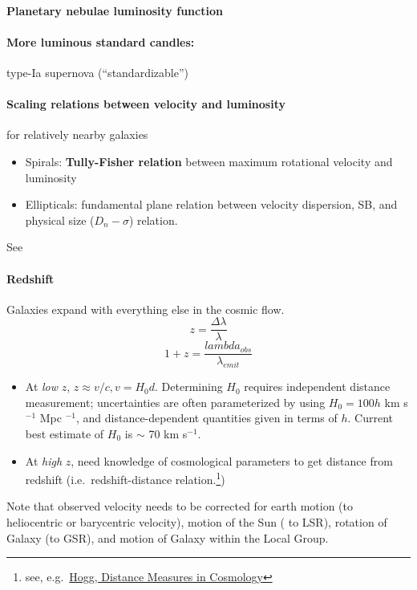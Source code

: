 \documentclass{article}
\newcommand{\mynotes}[1]{\textcolor{cadmiumgreen}{#1}}
\begin{document}
\paragraph{Planetary nebulae luminosity function}

\paragraph{More luminous standard candles:}
type-Ia supernova (``standardizable'')

\paragraph{Scaling relations between velocity and luminosity}
\mynotes{for relatively nearby galaxies}
\begin{itemize}
    \item Spirals: \textbf{Tully-Fisher relation} between maximum rotational velocity and luminosity
    \item Ellipticals: fundamental plane relation between velocity
        dispersion, SB, and physical size
        ($D_{n}-\sigma$) relation.
\end{itemize}
See %

\paragraph{Redshift}
Galaxies expand with everything else in the cosmic flow.
\[
    z = \frac{\Delta\lambda}{\lambda}
    \]
\[
    1 + z = \frac{lambda_{obs}}{\lambda_{emit}}
    \]
\begin{itemize}
    \item At \emph{low} $z$, $z \approx v/c, v = H_{0}d$.
        Determining $H_{0}$ requires independent distance measurement;
        uncertainties are often parameterized by using $H_{0} = 100h$
        km s$^{-1}$ Mpc $^{-1}$, and distance-dependent quantities given
        in terms of $h$. Current best estimate of $H_{0}$ is $\sim$ 70 km s$^{-1}$.
    \item At \emph{high} $z$, need knowledge of cosmological
        parameters to get distance from redshift (i.e.\ redshift-distance
        relation.\footnote{see, e.g.\
        \href{http://ned.ipac.caltech.edu/level5/Hogg/Hogg_contents.html}
        {Hogg, Distance Measures in Cosmology}})
\end{itemize}

Note that observed velocity needs to be corrected for earth motion (to
heliocentric or barycentric velocity), motion of the Sun ( to LSR), rotation of
Galaxy (to GSR), and motion of Galaxy within the Local Group.
\end{document}
